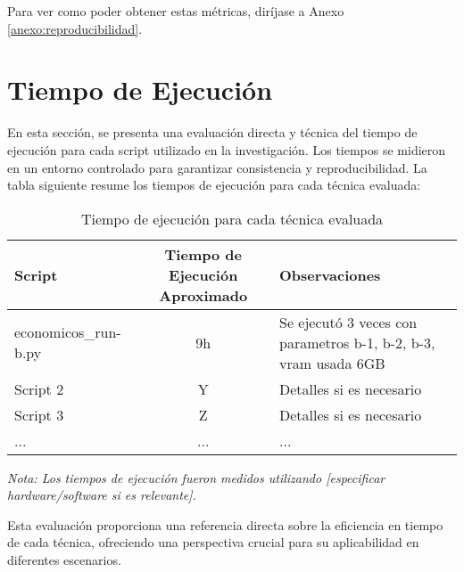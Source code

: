 Para ver como poder obtener estas métricas, diríjase a Anexo \ref{anexo:reproducibilidad}.

\section{Tiempo de Ejecución}

En esta sección, se presenta una evaluación directa y técnica del tiempo de ejecución para cada script utilizado en la investigación. Los tiempos se midieron en un entorno controlado para garantizar consistencia y reproducibilidad. La tabla siguiente resume los tiempos de ejecución para cada técnica evaluada:

\begin{table}[h]
\centering
\begin{tabular}{|l|c|p{5cm}|}
\hline
\rowcolor[gray]{0.8}
\textbf{Script} & \textbf{Tiempo de Ejecución Aproximado} & \textbf{Observaciones} \\
\hline
economicos\_run-b.py & 9h & Se ejecutó 3 veces con parametros b-1, b-2, b-3, vram usada 6GB  \\
\hline
Script 2 & Y & Detalles si es necesario \\
Script 3 & Z & Detalles si es necesario \\
...      & ... & ... \\
\hline
\end{tabular}
\caption{Tiempo de ejecución para cada técnica evaluada}
\label{table:tiempo-ejecucion}
\end{table}

\textit{Nota: Los tiempos de ejecución fueron medidos utilizando [especificar hardware/software si es relevante].}

Esta evaluación proporciona una referencia directa sobre la eficiencia en tiempo de cada técnica, ofreciendo una perspectiva crucial para su aplicabilidad en diferentes escenarios.
